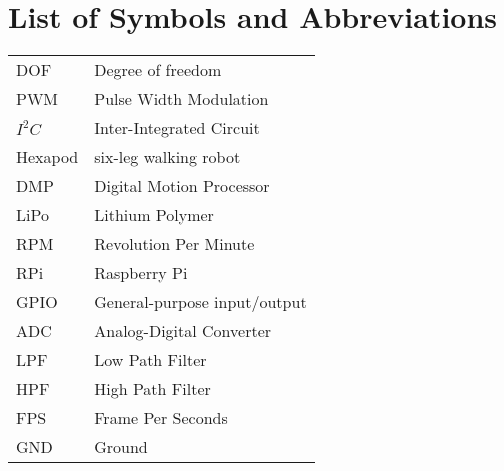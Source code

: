 




\pagestyle{empty}


\maketitle 						%

\frontmatter %
\pagestyle{fancy}



\tableofcontents
\listoffigures
\listoftables
\listofalgorithms


\chapter*{List of Symbols and Abbreviations}

\begin{tabular}{l l}
	DOF      & Degree of freedom    \\
	PWM     & Pulse Width Modulation       \\
	$I^2C$  & Inter-Integrated Circuit     \\
	Hexapod & six-leg walking robot\\
	DMP     & Digital Motion Processor     \\
	LiPo     & Lithium Polymer      \\
	RPM     & Revolution Per Minute\\
	RPi      & Raspberry Pi \\
	GPIO   & General-purpose input/output \\
	ADC    & Analog-Digital Converter     \\
	LPF     & Low Path Filter      \\
	HPF    & High Path Filter     \\
	FPS     & Frame Per Seconds    \\
	GND   & Ground
\end{tabular} 


